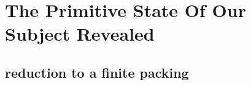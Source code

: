 %
%
%
%
%
%
%






\section{The Primitive State Of Our Subject Revealed}

\subsection{reduction to a finite packing}


